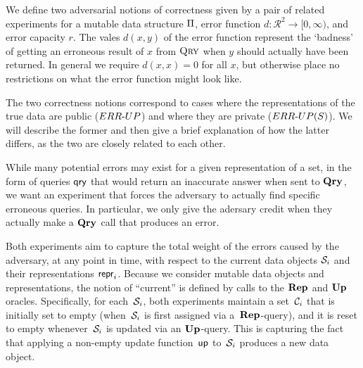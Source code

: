 


We define two adversarial notions of correctness given by a pair of related
experiments for a mutable data structure $\mathrm{\Pi}$, error function $d:
\mathcal{R}^2 \to [0,\infty)$, and error capacity $r$. The vales $d(x,y)$ of the
error function represent the `badness' of getting an erroneous result of $x$
from $\textnormal{\textsc{Qry}}$ when $y$ should actually have been returned. In general we require
$d(x,x) = 0$ for all $x$, but otherwise place no restrictions on what the error
function might look like.

The two correctness notions correspond to cases where the representations of the
true data are public (${ERR\mbox{-}UP}$) and where they are private (${ERR\mbox{-}UP(S)}$). We will
describe the former and then give a brief explanation of how the latter differs,
as the two are closely related to each other.

While many potential errors may exist for a given representation of a set, in
the form of queries $\mathsf{qry}$ that would return an inaccurate answer when sent to
$\textup{\textbf{Qry}}\hspace{0.5pt}$, we want an experiment that forces the adversary to actually find
specific erroneous queries. In particular, we only give the adersary credit when
they actually make a $\textup{\textbf{Qry}}\hspace{0.5pt}$ call that produces an error.

Both experiments aim to capture the total weight of the errors caused by the
adversary, at any point in time, with respect to the current data objects
$\mathcal{S}_i$ and their representations $\mathsf{repr}_i$.  Because we consider mutable data
objects and representations, the notion of ``current'' is defined by calls to
the $\textup{\textbf{Rep}}\hspace{0.5pt}$ and $\textup{\textbf{Up}}\hspace{0.5pt}$ oracles.  Specifically, for each~$\mathcal{S}_i$, both
experiments maintain a set~$\mathcal{C}_i$ that is initially set to empty
(when~$\mathcal{S}_i$ is first assigned via a~$\textup{\textbf{Rep}}\hspace{0.5pt}$-query), and it is reset to empty
whenever~$\mathcal{S}_i$ is updated via an $\textup{\textbf{Up}}\hspace{0.5pt}$-query.  This is capturing the fact
that applying a non-empty update function~$\mathsf{up}$ to~$\mathcal{S}_i$ produces a new data
object.

